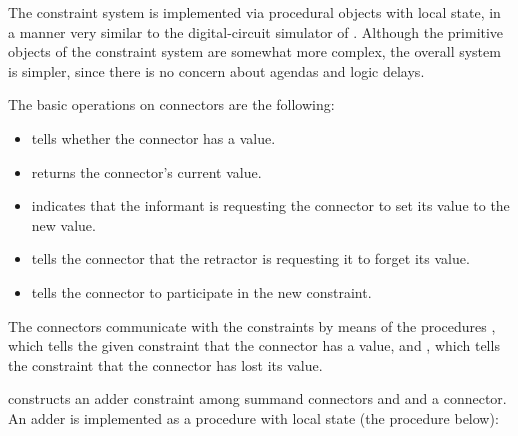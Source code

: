 The constraint system is implemented via procedural objects with local state,
in a manner very similar to the digital-circuit simulator of
.  Although the primitive objects of the constraint system are
somewhat more complex, the overall system is simpler, since there is no concern
about agendas and logic delays.

The basic operations on connectors are the following:

\begin{itemize}

\item
{} tells whether the connector has a value.

\item
{} returns the connector's current value.

\item
{}
indicates that the informant is requesting the connector to set its value to
the new value.

\item
{} tells the connector
that the retractor is requesting it to forget its value.

\item
{} tells the connector
to participate in the new constraint.

\end{itemize}

\noindent
The connectors communicate with the constraints by means of the procedures
, which tells the given constraint that the connector
has a value, and , which tells the constraint that
the connector has lost its value.

 constructs an adder constraint among summand connectors 
and  and a  connector.  An adder is implemented as a
procedure with local state (the procedure  below):

